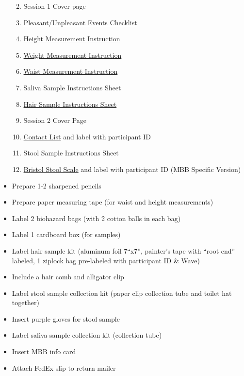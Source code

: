 \documentclass[]{book}
\providecommand{\tightlist}{%
  \setlength{\itemsep}{0pt}\setlength{\parskip}{0pt}}
\begin{document}
\begin{itemize}
  \begin{enumerate}
  \def\labelenumi{\arabic{enumi}.}
  \tightlist
  \item
    Session 1 Cover page
  \item
    \href{https://ucla.app.box.com/file/630327764749}{Pleasant/Unpleasant Events Checklist}
  \item
    \href{https://ucla.app.box.com/file/698389151155}{Height Measurement Instruction}
  \item
    \href{https://ucla.app.box.com/file/698395394087}{Weight Measurement Instruction}
  \item
    \href{https://ucla.app.box.com/file/698395657078}{Waist Measurement Instruction}
  \item
    Saliva Sample Instructions Sheet
  \item
    \href{https://ucla.app.box.com/file/685938821891}{Hair Sample Instructions Sheet}
  \item
    Session 2 Cover Page
  \item
    \href{https://ucla.app.box.com/file/639652767665}{Contact List} and label with participant ID
  \item
    Stool Sample Instructions Sheet
  \item
    \href{https://app.box.com/file/630326499609}{Bristol Stool Scale} and label with participant ID (MBB Specific Version)
  \end{enumerate}
\item
  Prepare 1-2 sharpened pencils
\item
  Prepare paper measuring tape (for waist and height measurements)
\item
  Label 2 biohazard bags (with 2 cotton balls in each bag)
\item
  Label 1 cardboard box (for samples)
\item
  Label hair sample kit (aluminum foil 7``x7'', painter's tape with ``root end'' labeled, 1 ziplock bag pre-labeled with participant ID \& Wave)
\item
  Include a hair comb and alligator clip
\item
  Label stool sample collection kit (paper clip collection tube and toilet hat together)
\item
  Insert purple gloves for stool sample
\item
  Label saliva sample collection kit (collection tube)
\item
  Insert MBB info card
\item
  Attach FedEx slip to return mailer

\end{itemize}
\end{document}
